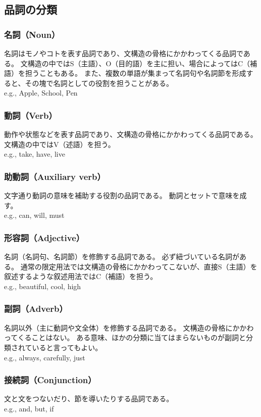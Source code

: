\subsection{品詞の分類}

\subsubsection{名詞（Noun）}
名詞はモノやコトを表す品詞であり、文構造の骨格にかかわってくる品詞である。
文構造の中ではS（主語）、O（目的語）を主に担い、場合によってはC（補語）を担うこともある。
また、複数の単語が集まって名詞句や名詞節を形成すると、その塊で名詞としての役割を担うことがある。\\
e.g., Apple, School, Pen

\subsubsection{動詞（Verb）}
動作や状態などを表す品詞であり、文構造の骨格にかかわってくる品詞である。
文構造の中ではV（述語）を担う。\\
e.g., take, have, live

\subsubsection{助動詞（Auxiliary verb）}
文字通り動詞の意味を補助する役割の品詞である。
動詞とセットで意味を成す。\\
e.g., can, will, must

\subsubsection{形容詞（Adjective）}
名詞（名詞句、名詞節）を修飾する品詞である。
必ず紐づいている名詞がある。
通常の限定用法では文構造の骨格にかかわってこないが、直接S（主語）を叙述するような叙述用法ではC（補語）を担う。\\
e.g., beautiful, cool, high

\subsubsection{副詞（Adverb）}
名詞以外（主に動詞や文全体）を修飾する品詞である。
文構造の骨格にかかわってくることはない。
ある意味、ほかの分類に当てはまらないものが副詞と分類されていると言ってもよい。\\
e.g., always, carefully, just

\subsubsection{接続詞（Conjunction）}
文と文をつないだり、節を導いたりする品詞である。\\
e.g., and, but, if

